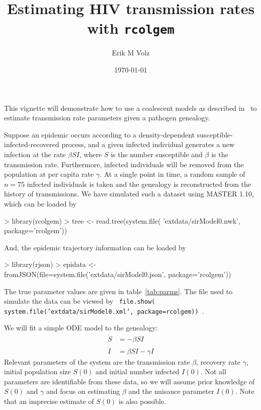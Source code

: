 \documentclass{article}
\begin{document}
\title{Estimating HIV transmission rates with \texttt{rcolgem}}
\author{Erik M Volz}
\date{\today}
\maketitle

This vignette will demonstrate how to use a coalescent models as described in~\cite{volz2012complex} to estimate transmission rate parameters given a pathogen genealogy.

Suppose an epidemic occurs according to a density-dependent susceptible-infected-recovered process, and a given infected individual generates a new infection at the rate $\beta S I$, where $S$ is the number susceptible and $\beta$ is the transmission rate.
Furthermore, infected individuals will be removed from the population at per capita rate $\gamma$. 
At a single point in time, a random sample of $n=75$ infected individuals is taken and the genealogy is reconstructed from the history of transmissions.
We have simulated such a dataset using MASTER 1.10\cite{vaughan2013stochastic}, which can be loaded by
\begin{Schunk}
\begin{Sinput}
> library(rcolgem)
> tree <- read.tree(system.file( 'extdata/sirModel0.nwk', package='rcolgem'))
\end{Sinput}
\end{Schunk}
And, the epidemic trajectory information can be loaded by
\begin{Schunk}
\begin{Sinput}
> library(rjson)
> epidata <- fromJSON(file=system.file('extdata/sirModel0.json', package='rcolgem')) 
\end{Sinput}
\end{Schunk}
The true parameter values are given in table~\ref{tab:parms}.
The file used to simulate the data can be viewed by \texttt{ file.show( system.file('extdata/sirModel0.xml', package=rcolgem)) }. 


We will fit a simple ODE model to the genealogy:
\begin{align}
\dot{S} &= -\beta S I  \\
\dot{I} &= \beta S I - \gamma I
\end{align}
Relevant parameters of the system are the transmission rate $\beta$, recovery rate $\gamma$, initial population size $S(0)$ and initial number infected $I(0)$. 
Not all parameters are identifiable from these data, so we will assume prior knowledge of $S(0)$ and $\gamma$ and focus on estimating $\beta$ and the nuisance parameter $I(0)$. Note that an imprecise estimate of $S(0)$ is also possible. 
\end{document}
